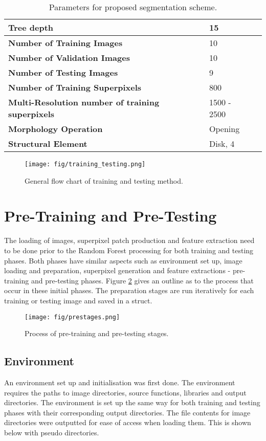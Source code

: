 \begin{table}[H]
\centering
\caption{Parameters for proposed segmentation scheme.}

\begin{tabular}{|l|l|l|}
\hline
\textbf{Tree depth}	& 15 \\		
\hline
\textbf{Number of Training Images} & 10 \\
\hline
\textbf{Number of Validation Images} & 10\\
\hline		
\textbf{Number of Testing Images} &  9 	\\ 	
\hline
\textbf{Number of Training Superpixels} & 800\\
\hline
\textbf{Multi-Resolution number of training superpixels} & 1500 - 2500\\		
\hline    	 
\textbf{Morphology Operation} & Opening\\
\hline
\textbf{Structural Element}	& Disk, 4\\
\hline
\end{tabular}
\label{table:finalparameters}
\end{table}

\begin{figure}[H]
\centering
\texttt{[image: fig/training\_testing.png]}
\caption{General flow chart of training and testing method.}
\label{fig:training_testing_flow}
\end{figure}

\section{Pre-Training and Pre-Testing}
\label{sect:pre}
The loading of images, superpixel patch production and feature extraction need to be done prior to the Random Forest processing for both training and testing phases. Both phases have similar aspects such as environment set up, image loading and preparation, superpixel generation and feature extractions - pre-training and pre-testing phases. Figure \ref{fig:prestages} gives an outline as to the process that occur in these initial phases. The preparation stages are run iteratively for each training or testing image and saved in a struct.

\begin{figure}[H]
\centering
\texttt{[image: fig/prestages.png]}
\caption{Process of pre-training and pre-testing stages.}
\label{fig:prestages}
\end{figure}

\subsection{Environment}
An environment set up and initialisation was first done. The environment requires the paths to image directories, source functions, libraries and output directories. The environment is set up the same way for both training and testing phases with their corresponding output directories. The file contents for image directories were outputted for ease of access when loading them.  This is shown below with pseudo directories.

